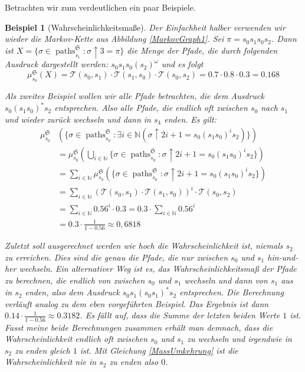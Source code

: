 \documentclass{lni}
\theoremstyle{def_style}
\theoremstyle{break}
\newtheorem{example}{Beispiel}
\newcommand{\paths}[2]{\operatorname{paths}^{#1}_{#2}}
\begin{document}
Betrachten wir zum verdeutlichen ein paar Beispiele.
\begin{example}[Wahrscheinlichkeitsmaße]
	Der Einfachheit halber verwenden wir wieder die Markov-Kette aus Abbildung \ref{MarkovGraph1}. Sei $\pi=s_0s_1s_0s_2$. 
	Dann ist $X=\{\sigma \in \paths{\mathfrak{S}}{s_1} : \sigma\uparrow 3 = \pi\}$ die Menge der Pfade, die durch folgenden Ausdruck dargestellt werden: $s_0s_1s_0(s_2)^\omega$ und es folgt
	$$\mu^\mathfrak{S}_{s_0}(X)=\mathcal{T}(s_0,s_1) \cdot \mathcal{T}(s_1,s_0) \cdot \mathcal{T}(s_0,s_2) = 0.7 \cdot 0.8 \cdot 0.3 = 0.168$$
	
	Als zweites Beispiel wollen wir alle Pfade betrachten, die dem Ausdruck $s_0(s_1s_0)^\ast s_2$ entsprechen. Also alle Pfade, die endlich oft zwischen $s_0$ nach $s_1$ und wieder zurück wechseln und dann in $s_4$ enden. Es gilt:
	\begin{align*}
		\mu^\mathfrak{S}_{s_0}&(\{\sigma\in \paths{\mathfrak{S}}{s_0} : \exists i\in \mathbb{N} (\sigma\uparrow 2i+1 = s_0(s_1s_0)^i s_2)\}) \\
		&=\mu^\mathfrak{S}_{s_0} \left(\bigcup_{i\in \mathbb{N}} \{\sigma\in \paths{\mathfrak{S}}{s_0} : \sigma\uparrow 2i+1 = s_0(s_1s_0)^i s_2\}\right) \\
		&=\sum_{i\in \mathbb{N}} \mu^\mathfrak{S}_{s_0}(\{\sigma\in \paths{\mathfrak{S}}{s_0} : \sigma\uparrow 2i+1 = s_0(s_1s_0)^i s_2\}) \\
		&=\sum_{i\in \mathbb{N}} (\mathcal{T}(s_0, s_1) \cdot \mathcal{T}(s_1, s_0))^i \cdot \mathcal{T}(s_0,s_2) \\
		&=\sum_{i\in \mathbb{N}} 0.56^i \cdot 0.3 = 0.3 \cdot \sum_{i\in \mathbb{N}} 0.56^i \\
		&= 0.3 \cdot \frac{1}{1-0.56} \approx 0,6818
	\end{align*}
	
	Zuletzt soll ausgerechnet werden wie hoch die Wahrscheinlichkeit ist, niemals $s_2$ zu erreichen. Dies sind die genau die Pfade, die nur zwischen $s_0$ und $s_1$ hin-und-her wechseln. Ein alternativer Weg ist es, das Wahrscheinlichkeitsmaß der Pfade zu berechnen, die endlich von zwischen $s_0$ und $s_1$ wechseln und dann von $s_1$ aus in $s_2$ enden, also dem Ausdruck $s_0s_1(s_0s_1)^\ast s_2$ entsprechen. Die Berechnung verläuft analog zu dem eben vorgeführten Beispiel. Das Ergebnis ist dann $0.14\cdot\frac{1}{1-0.56} \approx 0.3182$. Es fällt auf, dass die Summe der letzten beiden Werte $1$ ist. Fasst meine beide Berechnungen zusammen erhält man demnach, dass die Wahrscheinlichkeit endlich oft zwischen $s_0$ und $s_1$ zu wechseln und irgendwie in $s_2$ zu enden gleich $1$ ist. Mit Gleichung \ref{MassUmkehrung} ist die Wahrscheinlichkeit nie in $s_2$ zu enden also $0$.
\end{example}
\end{document}
